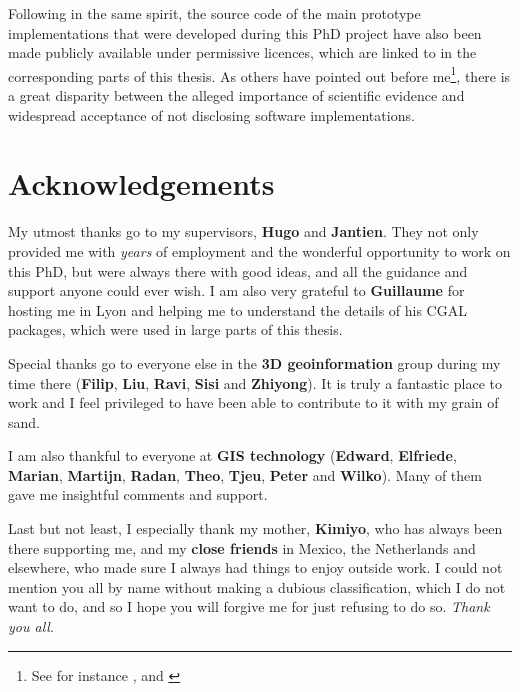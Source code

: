 Following in the same spirit, the source code of the main prototype implementations that were developed during this PhD project have also been made publicly available under permissive licences, which are linked to in the corresponding parts of this thesis.
As others have pointed out before me\footnote{See for instance \citet{Morin12}, \citet{Joppa13} and \citet{Ince12}}, there is a great disparity between the alleged importance of scientific evidence and widespread acceptance of not disclosing software implementations.

\section*{Acknowledgements}

My utmost thanks go to my supervisors, \textbf{Hugo} and \textbf{Jantien}.
They not only provided me with \emph{years} of employment and the wonderful opportunity to work on this PhD, but were always there with good ideas, and all the guidance and support anyone could ever wish.
I am also very grateful to \textbf{Guillaume} for hosting me in Lyon and helping me to understand the details of his CGAL packages, which were used in large parts of this thesis.

Special thanks go to everyone else in the \textbf{3D geoinformation} group during my time there (\textbf{Filip}, \textbf{Liu}, \textbf{Ravi}, \textbf{Sisi} and \textbf{Zhiyong}).
It is truly a fantastic place to work and I feel privileged to have been able to contribute to it with my grain of sand.

I am also thankful to everyone at \textbf{GIS technology} (\textbf{Edward}, \textbf{Elfriede}, \textbf{Marian}, \textbf{Martijn}, \textbf{Radan}, \textbf{Theo}, \textbf{Tjeu}, \textbf{Peter} and \textbf{Wilko}).
Many of them gave me insightful comments and support.

Last but not least, I especially thank my mother, \textbf{Kimiyo}, who has always been there supporting me, and my \textbf{close friends} in Mexico, the Netherlands and elsewhere, who made sure I always had things to enjoy outside work.
I could not mention you all by name without making a dubious classification, which I do not want to do, and so I hope you will forgive me for just refusing to do so.
\emph{Thank you all}.